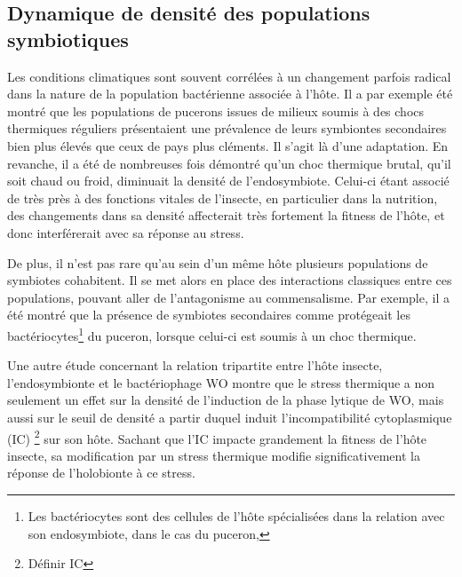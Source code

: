 \subsection{Dynamique de densité des populations symbiotiques} %
\label{sub:taillepop}

Les conditions climatiques sont souvent corrélées à un changement parfois
radical dans la nature de la population bactérienne associée à l'hôte. Il a
par exemple été montré \cite{harmon2009} que les populations de pucerons
issues de milieux soumis à des chocs thermiques réguliers présentaient une
prévalence de leurs symbiontes secondaires bien plus élevés que ceux de pays
plus cléments. 
Il s'agit là d'une adaptation.
En revanche, il a été de nombreuses fois démontré qu'un choc thermique brutal, qu'il soit chaud ou froid, diminuait la densité de l'endosymbiote.
Celui-ci étant associé de très près à des fonctions vitales de l'insecte, en particulier dans la nutrition, des changements dans sa densité affecterait très fortement la fitness de l'hôte, et donc interférerait avec sa réponse au stress.

De plus, il n'est pas rare qu'au sein d'un même hôte plusieurs populations de symbiotes
cohabitent.
Il se met alors en place des interactions classiques entre ces
populations, pouvant aller de l'antagonisme au commensalisme. Par exemple, il
a été montré \cite{montllor2002} que la présence de symbiotes secondaires
comme  protégeait les bactériocytes\footnote{Les
bactériocytes sont des cellules de l'hôte spécialisées dans la relation avec
son endosymbiote, dans le cas du puceron, } du puceron,
lorsque celui-ci est soumis à un choc thermique.

Une autre étude \cite{bordenstein2011} concernant la relation tripartite entre l'hôte insecte, l'endosymbionte  et le bactériophage WO montre que le stress thermique a non seulement un effet sur la densité de  l'induction de la phase lytique de WO, mais aussi sur le seuil de densité a partir duquel  induit l'incompatibilité cytoplasmique (IC)%
\footnote{Définir IC} sur son hôte.
Sachant que l'IC impacte grandement la fitness de l'hôte insecte, sa modification par un stress thermique modifie significativement la réponse de l'holobionte à ce stress.


